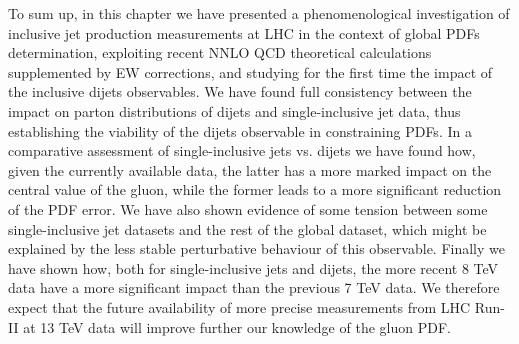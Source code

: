 %
To sum up, in this chapter we have presented a phenomenological investigation of inclusive jet
production measurements at LHC in the context of global PDFs determination, exploiting recent NNLO QCD 
theoretical calculations supplemented by EW corrections,
and studying for the first time the impact of the inclusive dijets observables.
We have found full consistency between the impact on parton distributions of dijets and single-inclusive jet data,
thus establishing the viability of the dijets observable in constraining PDFs.
In a comparative assessment of single-inclusive jets vs. dijets we have found how, given the currently available data,
the latter has a more marked impact on the central value of the gluon, 
while the former leads to a more significant reduction of the PDF error. We have also shown evidence of some tension
between some single-inclusive jet datasets and the rest of the global dataset, which might be explained by the less stable
perturbative behaviour of this observable.
Finally we have shown how, both for single-inclusive jets and dijets, the more recent 8 TeV data have a more significant
impact than the previous 7 TeV data. We therefore expect that the future availability of more precise measurements
from LHC Run-II at 13 TeV data will improve further our knowledge of the gluon PDF.   